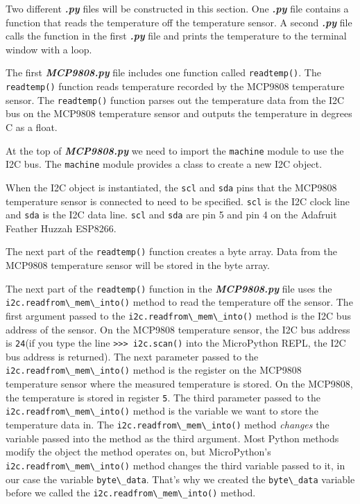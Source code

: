 \documentclass{book}
\newcommand{\passthrough}[1]{#1}
\begin{document}
Two different \textbf{\emph{.py}} files will be constructed in this
section. One \textbf{\emph{.py}} file contains a function that reads the
temperature off the temperature sensor. A second \textbf{\emph{.py}}
file calls the function in the first \textbf{\emph{.py}} file and prints
the temperature to the terminal window with a loop.
    




    
        The first \textbf{\emph{MCP9808.py}} file includes one function called
\passthrough{\lstinline!readtemp()!}. The
\passthrough{\lstinline!readtemp()!} function reads temperature recorded
by the MCP9808 temperature sensor. The
\passthrough{\lstinline!readtemp()!} function parses out the temperature
data from the I2C bus on the MCP9808 temperature sensor and outputs the
temperature in degrees C as a float.

At the top of \textbf{\emph{MCP9808.py}} we need to import the
\passthrough{\lstinline!machine!} module to use the I2C bus. The
\passthrough{\lstinline!machine!} module provides a class to create a
new I2C object.

When the I2C object is instantiated, the \passthrough{\lstinline!scl!}
and \passthrough{\lstinline!sda!} pins that the MCP9808 temperature
sensor is connected to need to be specified.
\passthrough{\lstinline!scl!} is the I2C clock line and
\passthrough{\lstinline!sda!} is the I2C data line.
\passthrough{\lstinline!scl!} and \passthrough{\lstinline!sda!} are pin
5 and pin 4 on the Adafruit Feather Huzzah ESP8266.

The next part of the \passthrough{\lstinline!readtemp()!} function
creates a byte array. Data from the MCP9808 temperature sensor will be
stored in the byte array.

The next part of the \passthrough{\lstinline!readtemp()!} function in
the \textbf{\emph{MCP9808.py}} file uses the
\passthrough{\lstinline!i2c.readfrom\_mem\_into()!} method to read the
temperature off the sensor. The first argument passed to the
\passthrough{\lstinline!i2c.readfrom\_mem\_into()!} method is the I2C
bus address of the sensor. On the MCP9808 temperature sensor, the I2C
bus address is \passthrough{\lstinline!24!}(if you type the line
\passthrough{\lstinline!>>> i2c.scan()!} into the MicroPython REPL, the
I2C bus address is returned). The next parameter passed to the
\passthrough{\lstinline!i2c.readfrom\_mem\_into()!} method is the
register on the MCP9808 temperature sensor where the measured
temperature is stored. On the MCP9808, the temperature is stored in
register \passthrough{\lstinline!5!}. The third parameter passed to the
\passthrough{\lstinline!i2c.readfrom\_mem\_into()!} method is the
variable we want to store the temperature data in. The
\passthrough{\lstinline!i2c.readfrom\_mem\_into()!} method
\emph{changes} the variable passed into the method as the third
argument. Most Python methods modify the object the method operates on,
but MicroPython's \passthrough{\lstinline!i2c.readfrom\_mem\_into()!}
method changes the third variable passed to it, in our case the variable
\passthrough{\lstinline!byte\_data!}. That's why we created the
\passthrough{\lstinline!byte\_data!} variable before we called the
\passthrough{\lstinline!i2c.readfrom\_mem\_into()!} method.
\end{document}
